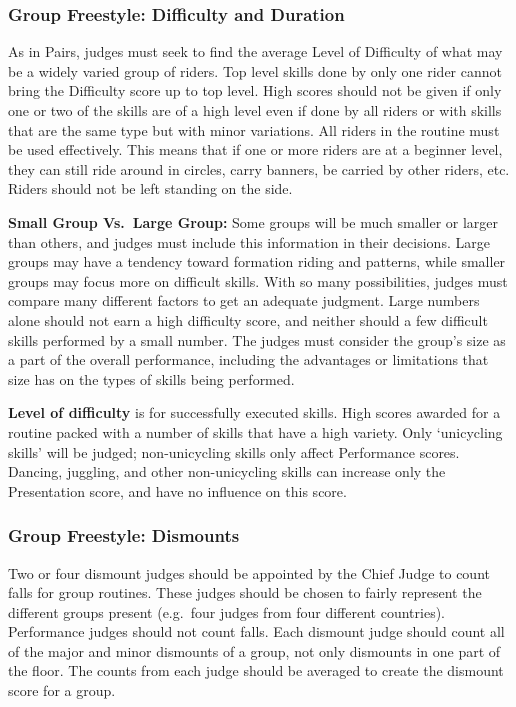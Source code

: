 \subsubsection{Group Freestyle: Difficulty and Duration \label{subsec:freestyle_group-additional-judging-criteria_difficulty-duration}}
As in Pairs, judges must seek to find the average Level of Difficulty of what may be a widely varied group of riders.
Top level skills done by only one rider cannot bring the Difficulty score up to top level.
High scores should not be given if only one or two of the skills are of a high level even if done by all riders or with skills that are the same type but with minor variations.
All riders in the routine must be used effectively.
This means that if one or more riders are at a beginner level, they can still ride around in circles, carry banners, be carried by other riders, etc.
Riders should not be left standing on the side.

\textbf{Small Group Vs.\ Large Group:} Some groups will be much smaller or larger than others, and judges must include this information in their decisions.
Large groups may have a tendency toward formation riding and patterns, while smaller groups may focus more on difficult skills.
With so many possibilities, judges must compare many different factors to get an adequate judgment.
Large numbers alone should not earn a high difficulty score, and neither should a few difficult skills performed by a small number.
The judges must consider the group's size as a part of the overall performance, including the advantages or limitations that size has on the types of skills being performed.

\textbf{Level of difficulty} is for successfully executed skills.
High scores awarded for a routine packed with a number of skills that have a high variety.
Only `unicycling skills' will be judged; non-unicycling skills only affect Performance scores.
Dancing, juggling, and other non-unicycling skills can increase only the Presentation score, and have no influence on this score.

\subsubsection{Group Freestyle: Dismounts \label{subsec:freestyle_group-additional-judging-criteria_dismounts}} %
Two or four dismount judges should be appointed by the Chief Judge to count falls for group routines.%
These judges should be chosen to fairly represent the different groups present (e.g.\ four judges from four different countries).
Performance judges should not count falls.
Each dismount judge should count all of the major and minor dismounts of a group, not only dismounts in one part of the floor.
The counts from each judge should be averaged to create the dismount score for a group.

